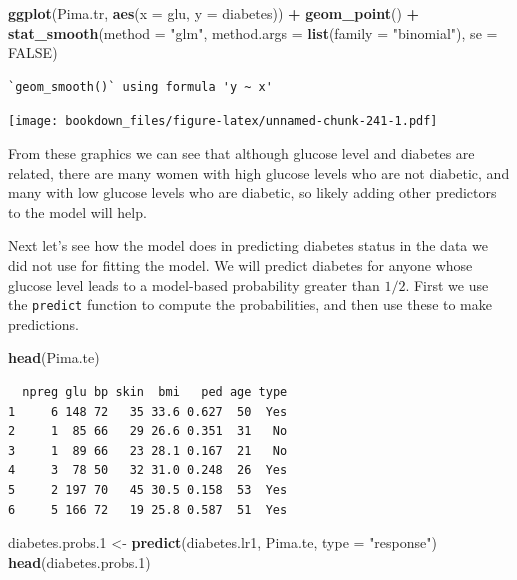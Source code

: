 \documentclass[
]{krantz}
\makeatletter
\newenvironment{Shaded}{\begin{snugshade}}{\end{snugshade}}
\newcommand{\DataTypeTok}[1]{\textcolor[rgb]{0.27,0.27,0.27}{#1}}
\newcommand{\FloatTok}[1]{\textcolor[rgb]{0.06,0.06,0.06}{#1}}
\newcommand{\KeywordTok}[1]{\textcolor[rgb]{0.27,0.27,0.27}{\textbf{#1}}}
\newcommand{\NormalTok}[1]{#1}
\newcommand{\OperatorTok}[1]{\textcolor[rgb]{0.43,0.43,0.43}{\textbf{#1}}}
\newcommand{\OtherTok}[1]{\textcolor[rgb]{0.37,0.37,0.37}{#1}}
\newcommand{\StringTok}[1]{\textcolor[rgb]{0.5,0.5,0.5}{#1}}
\newenvironment{kframe}{%
\medskip{}
\setlength{\fboxsep}{.8em}
 \def\at@end@of@kframe{}%
 \ifinner\ifhmode%
  \def\at@end@of@kframe{\end{minipage}}%
  \begin{minipage}{\columnwidth}%
 \fi\fi%
 \def\FrameCommand##1{\hskip\@totalleftmargin \hskip-\fboxsep
 \colorbox{shadecolor}{##1}\hskip-\fboxsep
     \hskip-\linewidth \hskip-\@totalleftmargin \hskip\columnwidth}%
 \MakeFramed {\advance\hsize-\width
   \@totalleftmargin\z@ \linewidth\hsize
   \@setminipage}}%
 {\par\unskip\endMakeFramed%
 \at@end@of@kframe}
\renewenvironment{Shaded}{\begin{kframe}}{\end{kframe}}
\makeatother
\begin{document}
\begin{Shaded}
\begin{Highlighting}[]
\KeywordTok{ggplot}\NormalTok{(Pima.tr, }\KeywordTok{aes}\NormalTok{(}\DataTypeTok{x =}\NormalTok{ glu, }\DataTypeTok{y =}\NormalTok{ diabetes)) }\OperatorTok{+}\StringTok{ }
\StringTok{  }\KeywordTok{geom\_point}\NormalTok{() }\OperatorTok{+}\StringTok{ }
\StringTok{  }\KeywordTok{stat\_smooth}\NormalTok{(}\DataTypeTok{method =} \StringTok{"glm"}\NormalTok{, }
              \DataTypeTok{method.args =} \KeywordTok{list}\NormalTok{(}\DataTypeTok{family =} \StringTok{"binomial"}\NormalTok{), }\DataTypeTok{se =} \OtherTok{FALSE}\NormalTok{)}
\end{Highlighting}
\end{Shaded}

\begin{verbatim}
`geom_smooth()` using formula 'y ~ x'
\end{verbatim}

\texttt{[image: bookdown\_files/figure-latex/unnamed-chunk-241-1.pdf]}

From these graphics we can see that although glucose level and diabetes are related, there are many women with high glucose levels who are not diabetic, and many with low glucose levels who are diabetic, so likely adding other predictors to the model will help.

Next let's see how the model does in predicting diabetes status in the data we did not use for fitting the model. We will predict diabetes for anyone whose glucose level leads to a model-based probability greater than \(1/2\). First we use the \texttt{predict} function to compute the probabilities, and then use these to make predictions.

\begin{Shaded}
\begin{Highlighting}[]
\KeywordTok{head}\NormalTok{(Pima.te)}
\end{Highlighting}
\end{Shaded}

\begin{verbatim}
  npreg glu bp skin  bmi   ped age type
1     6 148 72   35 33.6 0.627  50  Yes
2     1  85 66   29 26.6 0.351  31   No
3     1  89 66   23 28.1 0.167  21   No
4     3  78 50   32 31.0 0.248  26  Yes
5     2 197 70   45 30.5 0.158  53  Yes
6     5 166 72   19 25.8 0.587  51  Yes
\end{verbatim}

\begin{Shaded}
\begin{Highlighting}[]
\NormalTok{diabetes.probs}\FloatTok{.1}\NormalTok{ \textless{}{-}}\StringTok{ }\KeywordTok{predict}\NormalTok{(diabetes.lr1, Pima.te, }\DataTypeTok{type =} \StringTok{"response"}\NormalTok{)}
\KeywordTok{head}\NormalTok{(diabetes.probs}\FloatTok{.1}\NormalTok{)}
\end{Highlighting}
\end{Shaded}
\end{document}
